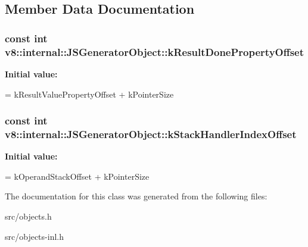 \subsection{Member Data Documentation}
\hypertarget{classv8_1_1internal_1_1_j_s_generator_object_a1622b2274b459f4a94643e9de9efbbe1}{}
\subsubsection[{k\+Result\+Done\+Property\+Offset}]{\setlength{\rightskip}{0pt plus 5cm}const int v8\+::internal\+::\+J\+S\+Generator\+Object\+::k\+Result\+Done\+Property\+Offset\hspace{0.3cm}{\ttfamily [static]}}\label{classv8_1_1internal_1_1_j_s_generator_object_a1622b2274b459f4a94643e9de9efbbe1}
{\bfseries Initial value\+:}
\begin{DoxyCode}
=
      kResultValuePropertyOffset + kPointerSize
\end{DoxyCode}
\hypertarget{classv8_1_1internal_1_1_j_s_generator_object_aec429b33c74fd957ce22f3b989bb776f}{}
\subsubsection[{k\+Stack\+Handler\+Index\+Offset}]{\setlength{\rightskip}{0pt plus 5cm}const int v8\+::internal\+::\+J\+S\+Generator\+Object\+::k\+Stack\+Handler\+Index\+Offset\hspace{0.3cm}{\ttfamily [static]}}\label{classv8_1_1internal_1_1_j_s_generator_object_aec429b33c74fd957ce22f3b989bb776f}
{\bfseries Initial value\+:}
\begin{DoxyCode}
=
      kOperandStackOffset + kPointerSize
\end{DoxyCode}


The documentation for this class was generated from the following files\+:\begin{DoxyCompactItemize}
\item 
src/objects.\+h\item 
src/objects-\/inl.\+h\end{DoxyCompactItemize}
